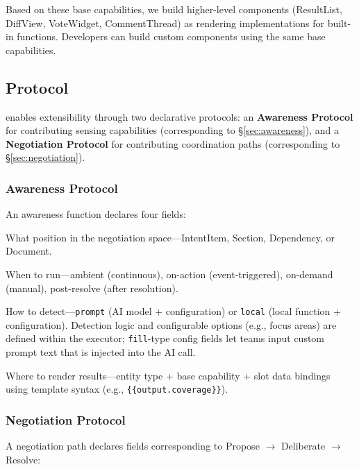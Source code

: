 \noindent Based on these base capabilities, we build higher-level components (ResultList, DiffView, VoteWidget, CommentThread) as rendering implementations for built-in functions. Developers can build custom components using the same base capabilities.


\subsection{Protocol}
\label{sec:protocol}

\system{} enables extensibility through two declarative protocols: an \textbf{Awareness Protocol} for contributing sensing capabilities (corresponding to \S\ref{sec:awareness}), and a \textbf{Negotiation Protocol} for contributing coordination paths (corresponding to \S\ref{sec:negotiation}).

\subsubsection{Awareness Protocol}

An awareness function declares four fields:

\begin{description}[leftmargin=1.5em, nosep, itemsep=3pt]
\item[Target:] What position in the negotiation space---IntentItem, Section, Dependency, or Document.
\item[Trigger:] When to run---ambient (continuous), on-action (event-triggered), on-demand (manual), post-resolve (after resolution).
\item[Executor:] How to detect---\texttt{prompt} (AI model + configuration) or \texttt{local} (local function + configuration). Detection logic and configurable options (e.g., focus areas) are defined within the executor; \texttt{fill}-type config fields let teams input custom prompt text that is injected into the AI call.
\item[Display:] Where to render results---entity type + base capability + slot data bindings using template syntax (e.g., \texttt{\{\{output.coverage\}\}}).
\end{description}


\subsubsection{Negotiation Protocol}

A negotiation path declares fields corresponding to Propose $\rightarrow$ Deliberate $\rightarrow$ Resolve:

